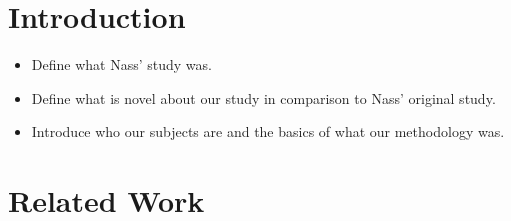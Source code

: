 \documentclass{sig-alternate-05-2015}
\begin{document}

%
%
\printccsdesc


\section{Introduction}
\begin{itemize}
    \item Define what Nass' study was.
    \item Define what is novel about our study in comparison to Nass' original study.
    \item Introduce who our subjects are and the basics of what our methodology was.
\end{itemize}

\section{Related Work}
\end{document}
